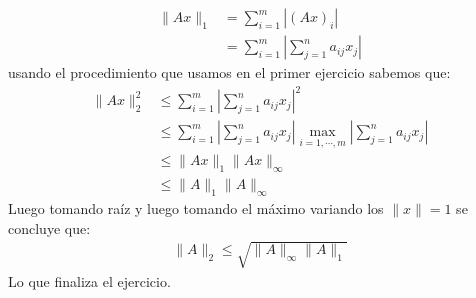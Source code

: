 \begin{homeworkProblem}
\begin{solucion}
\begin{enumerate}
        \begin{align*}
          \|Ax\|_1&=\sum_{i=1}^m\left| (Ax)_i \right|\\
          &=\sum_{i=1}^{m}\left| \sum_{j=1}^{n}a_{ij}x_j \right|
        \end{align*}
        usando el procedimiento que usamos en el primer ejercicio sabemos que:
        \begin{align*}
          \|Ax\|_{2}^2&\leq\sum_{i=1}^{m}\left| \sum_{j=1}^{n}a_{ij}x_j \right|^2\\
          &\leq\sum_{i=1}^{m}\left|\sum_{j=1}^{n}a_{ij}x_j\right|\max_{i=1,\cdots,m}\left|\sum_{j=1}^{n}a_{ij}x_j\right|\\
          &\leq \|Ax\|_1\|Ax\|_{\infty}\\
          &\leq \|A\|_{1}\|A\|_{\infty}
        \end{align*}
        Luego tomando raíz y luego tomando el máximo variando los $\|x\|=1$ se concluye que:
        \begin{align*}
          \|A\|_2\leq \sqrt{\|A\|_{\infty}\|A\|_{1}}
        \end{align*}
        Lo que finaliza el ejercicio.
        \demostrado
    \end{enumerate}  
  \end{solucion}
\end{homeworkProblem}
